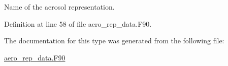 Name of the aerosol representation. 



Definition at line 58 of file aero\+\_\+rep\+\_\+data.\+F90.



The documentation for this type was generated from the following file\+:\begin{DoxyCompactItemize}
\item 
\mbox{\hyperlink{aero__rep__data_8_f90}{aero\+\_\+rep\+\_\+data.\+F90}}\end{DoxyCompactItemize}
